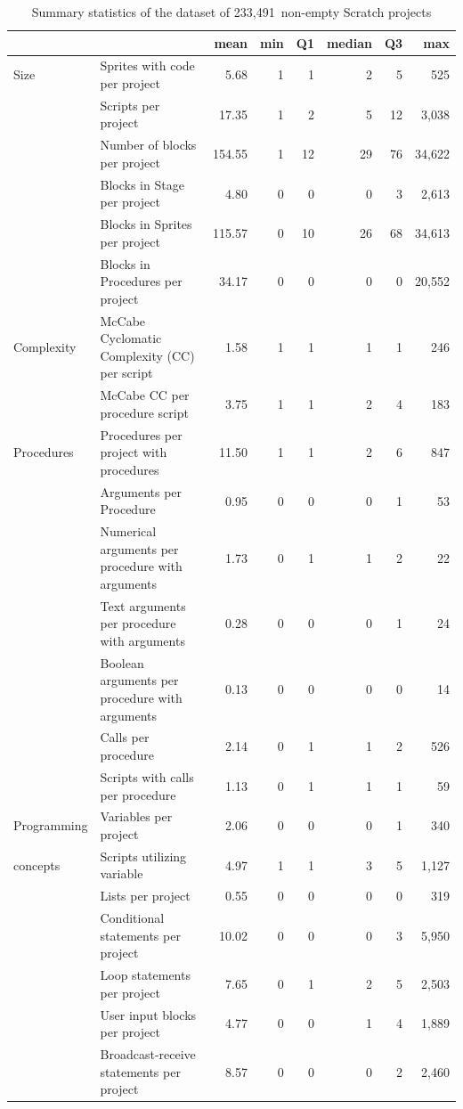 \documentclass{sig-alternate-05-2015}
\newcommand{\nScriptPrograms}{233,491}
\begin{document}
\begin{table}[ht]
	\centering
	\begin{tabular}{llrrrrrr}
		&&\textbf{mean}&\textbf{min}&\textbf{Q1}&\textbf{median}&\textbf{Q3}&\textbf{max}\\
		\hline
		Size&Sprites with code per project&5.68&1&1&2&5&525\\
		&Scripts per project&17.35&1&2&5&12&3,038\\
		&Number of blocks per project&154.55&1&12&29&76&34,622\\
		&Blocks in Stage per project&4.80&0&0&0&3&2,613\\
		&Blocks in Sprites per project&115.57&0&10&26&68&34,613\\
		&Blocks in Procedures per project&34.17&0&0&0&0&20,552\\
		\hline
		Complexity&McCabe Cyclomatic Complexity (CC) per script&1.58&1&1&1&1&246\\
		&McCabe CC per procedure script&3.75&1&1&2&4&183\\
		\hline
		Procedures&Procedures per project with procedures&11.50&1&1&2&6&847\\
		&Arguments per Procedure&0.95&0&0&0&1&53\\
		&Numerical arguments per procedure with arguments&1.73&0&1&1&2&22\\
		&Text arguments per procedure with arguments&0.28&0&0&0&1&24\\
		&Boolean arguments per procedure with arguments&0.13&0&0&0&0&14\\
		&Calls per procedure&2.14&0&1&1&2&526\\
		&Scripts with calls per procedure&1.13&0&1&1&1&59\\
		\hline
		Programming&Variables per project&2.06&0&0&0&1&340\\
		concepts&Scripts utilizing variable&4.97&1&1&3&5&1,127\\
		&Lists per project&0.55&0&0&0&0&319\\
		&Conditional statements per project&10.02&0&0&0&3&5,950\\
		&Loop statements per project&7.65&0&1&2&5&2,503\\
		&User input blocks per project&4.77&0&0&1&4&1,889\\
		&Broadcast-receive statements per project&8.57&0&0&0&2&2,460\\	
		\hline
	\end{tabular}
	\caption{Summary statistics of the dataset of \nScriptPrograms~non-empty Scratch projects}
	\label{tbl-size}
\end{table}
\end{document}
